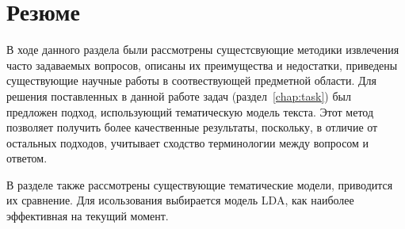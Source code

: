 \section{Резюме}
\label{sec:overview_concl}

В ходе данного раздела были рассмотрены сущестсвующие методики извлечения часто задаваемых вопросов, описаны их преимущества и недостатки, приведены существующие научные работы в соотвествующей предметной области. Для решения поставленных в данной работе задач (раздел~\ref{chap:task}) был предложен подход, использующий тематическую модель текста. Этот метод позволяет получить более качественные результаты, поскольку, в отличие от остальных подходов, учитывает сходство терминологии между вопросом и ответом.

В разделе также рассмотрены существующие тематические модели, приводится их сравнение. Для исользования выбирается модель LDA, как наиболее эффективная на текущий момент.